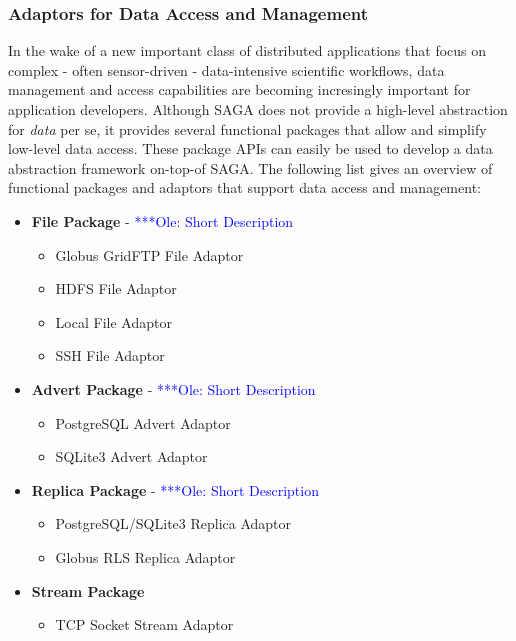 \documentclass[a4paper,10pt]{article}
\newcommand{\onote}[1]{  {\textcolor{blue}     { ***Ole: #1 }}}
\newcommand{\onote}[1]{}
\begin{document}
 \subsubsection{Adaptors for Data Access and Management}
 In the wake of a new important class of distributed applications that focus on 
 complex - often sensor-driven - data-intensive scientific workflows, data 
 management and access capabilities are becoming incresingly important for 
 application developers. Although SAGA does not provide a high-level abstraction
 for \textit{data} per se, it provides several functional packages that allow 
 and simplify low-level data access. These package APIs can easily be used to 
 develop a data abstraction framework on-top-of SAGA. The following list gives an
 overview of functional packages and adaptors that support data access and 
 management:
 
 \begin{itemize}

\item \textbf{File Package} - \onote{Short Description}

\begin{itemize}
\item Globus GridFTP File Adaptor
\item HDFS File Adaptor
\item Local File Adaptor
\item SSH File Adaptor

\end{itemize}

\item \textbf{Advert Package} - \onote{Short Description}

\begin{itemize}
\item PostgreSQL Advert Adaptor
\item SQLite3 Advert Adaptor
\end{itemize}

\item \textbf{Replica Package} - \onote{Short Description}

\begin{itemize}
\item PostgreSQL/SQLite3 Replica Adaptor
\item Globus RLS Replica Adaptor
\end{itemize}

\item \textbf{Stream Package}

\begin{itemize}
\item TCP Socket Stream Adaptor
\end{itemize}

\end{itemize}
 
\end{document}
